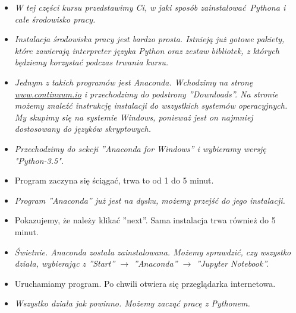 \documentclass{mwart}
\begin{document}
\begin{itemize}
  \item \emph{W tej części kursu przedstawimy Ci, w jaki sposób zainstalować Pythona i
      całe środowisko pracy.}
  \item \emph{Instalacja środowiska pracy jest bardzo prosta. Istnieją już gotowe pakiety,
    które zawierają interpreter języka Python oraz zestaw bibliotek, z których będziemy
    korzystać podczas trwania kursu.}
\item \emph{Jednym z takich programów jest Anaconda. Wchodzimy na stronę
    \url{www.continuum.io} i przechodzimy do podstrony ''Downloads''. Na stronie możemy
    znaleźć instrukcję instalacji do wszystkich systemów operacyjnych. My skupimy się
    na systemie Windows, ponieważ jest on najmniej dostosowany do języków skryptowych.}
\item \emph{Przechodzimy do sekcji ''Anaconda for Windows'' i wybieramy wersję
    "Python-3.5".}
  \item Program zaczyna się ściągać, trwa to od 1 do 5 minut.
  \item \emph{Program ''Anaconda'' już jest na dysku, możemy przejść do jego instalacji.}
  \item Pokazujemy, że należy klikać ''next''. Sama instalacja trwa również do 5 minut.
  \item \emph{Świetnie. Anaconda została zainstalowana. Możemy sprawdzić, czy wszystko działa,
    wybierając z ''Start'' $\rightarrow$ ''Anaconda'' $\rightarrow$ ''Jupyter
    Notebook''.}
  \item Uruchamiamy program. Po chwili otwiera się przeglądarka internetowa.
  \item \emph{Wszystko działa jak powinno. Możemy zacząć pracę z Pythonem.}
\end{itemize}
\end{document}

